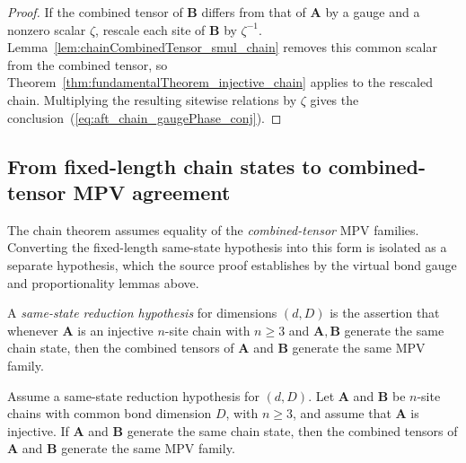 \begin{proof}
    \leanok
    If the combined tensor of $\mathbf{B}$ differs from that of $\mathbf{A}$
    by a gauge and a nonzero scalar $\zeta$, rescale each site of
    $\mathbf{B}$ by $\zeta^{-1}$. Lemma~\ref{lem:chainCombinedTensor_smul_chain}
    removes this common scalar from the combined tensor, so
    Theorem~\ref{thm:fundamentalTheorem_injective_chain} applies to the
    rescaled chain. Multiplying the resulting sitewise relations by $\zeta$
    gives the conclusion~(\ref{eq:aft_chain_gaugePhase_conj}).
\end{proof}

\subsection{From fixed-length chain states to combined-tensor MPV agreement}

The chain theorem assumes equality of the \emph{combined-tensor} MPV
families. Converting the fixed-length same-state hypothesis into this form
is isolated as a separate hypothesis, which the source proof establishes by
the virtual bond gauge and proportionality lemmas above.

\begin{definition}
    \label{def:same_state_reduction_hyp}
    \leanok
    A \emph{same-state reduction hypothesis} for dimensions $(d,D)$ is the
    assertion that whenever $\mathbf{A}$ is an injective $n$-site chain with
    $n \ge 3$ and $\mathbf{A},\mathbf{B}$ generate the same chain state,
    then the combined tensors of $\mathbf{A}$ and $\mathbf{B}$ generate the
    same MPV family.
\end{definition}

\begin{lemma}
    \label{lem:sameMPV_chainCombined_of_sameState}
    \leanok
    Assume a same-state reduction hypothesis for $(d,D)$.
    Let $\mathbf{A}$ and $\mathbf{B}$ be $n$-site chains with common bond
    dimension $D$, with $n \ge 3$, and assume that $\mathbf{A}$ is
    injective.
    If $\mathbf{A}$ and $\mathbf{B}$ generate the same chain state, then the
    combined tensors of $\mathbf{A}$ and $\mathbf{B}$ generate the same MPV
    family.
\end{lemma}

